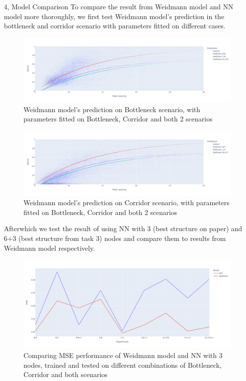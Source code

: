 \documentclass[10pt,a4paper]{article}
\begin{document}
\newpage

\begin{task}{4, Model Comparison}
To compare the result from Weidmann model and NN model more thoroughly, we first test Weidmann model's prediction in the bottleneck and corridor scenario with parameters fitted on different cases.


\begin{figure} [H]
    \centering
    \includegraphics[width=15cm]{images/Weidmann-b.png}
    \caption{Weidmann model's prediction on Bottleneck scenario, with parameters fitted on Bottleneck, Corridor and both 2 scenarios}
    \label{Weidmann-b}
\end{figure}

\begin{figure} [H]
    \centering
    \includegraphics[width=15cm]{images/Weidmann-c.png}
    \caption{Weidmann model's prediction on Corridor scenario, with parameters fitted on Bottleneck, Corridor and both 2 scenarios}
    \label{Weidmann-b}
\end{figure}

Afterwhich we test the result of using NN with 3 (best structure on paper) and 6+3 (best structure from task 3) nodes and compare them to results from Weidmann model respectively.

\begin{figure} [H]
    \centering
    \includegraphics[width=15cm]{images/Compare_3.png}
    \caption{Comparing MSE performance of Weidmann model and NN with 3 nodes, trained and tested on different combinations of Bottleneck, Corridor and both scenarios}
    \label{Weidmann-b}
\end{figure}



\end{task}
\end{document}
